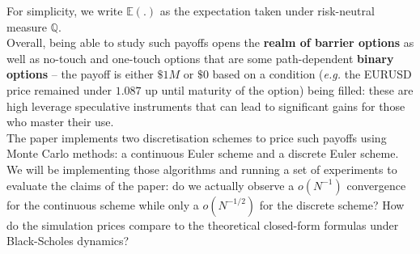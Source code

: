 For simplicity, we write $\mathbb{E}(.)$ as the expectation taken under risk-neutral measure $\mathbb{Q}$.\\

Overall, being able to study such payoffs opens the \textbf{realm of barrier options} as well as no-touch and one-touch options that are some path-dependent \textbf{binary options} -- the payoff is either $\$1M$ or $\$0$ based on a condition (\textit{e.g.} the EURUSD price remained under $1.087$ up until maturity of the option) being filled: these are high leverage speculative instruments that can lead to significant gains for those who master their use.\\

The paper implements two discretisation schemes to price such payoffs using Monte Carlo methods: a continuous Euler scheme and a discrete Euler scheme. We will be implementing those algorithms and running a set of experiments to evaluate the claims of the paper: do we actually observe a $o(N^{-1})$ convergence for the continuous scheme while only a $o(N^{-1/2})$ for the discrete scheme? How do the simulation prices compare to the theoretical closed-form formulas under Black-Scholes dynamics?




